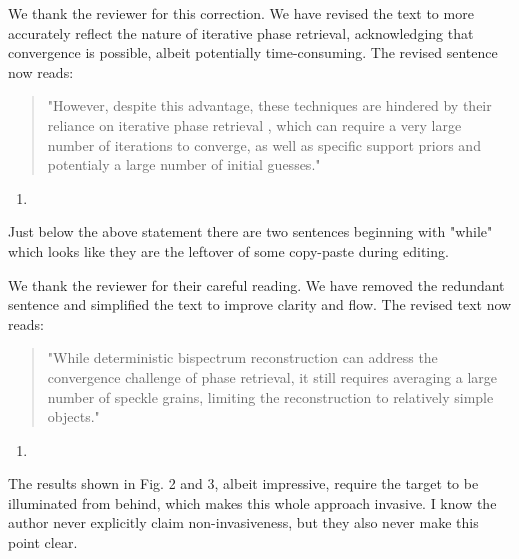 \documentclass[12pt]{article}
\newenvironment{solved_reviewercomment}
    {\begin{tcolorbox}[width=\linewidth,colback=gray!5,colframe=solved_commentcolor!50,title=Reviewer Comment,left=5pt,right=5pt]}
    {\end{tcolorbox}}
\newenvironment{finished_ourresponse}
    {\begin{tcolorbox}[width=\linewidth,breakable,enhanced,colback=gray!5,colframe=finished_responsecolor!50,title=Response,left=5pt,right=5pt]}
    {\end{tcolorbox}}
\begin{document}
\begin{finished_ourresponse}
    We thank the reviewer for this correction. We have revised the text to more accurately reflect the nature of iterative phase retrieval, acknowledging that convergence is possible, albeit potentially time-consuming. The revised sentence now reads:  
    \begin{quote}
        "However, despite this advantage, these techniques are hindered by their reliance on iterative phase retrieval \cite{fienup1978reconstruction}, which can require a very large number of iterations to converge, as well as specific support priors and potentialy a large number of initial guesses."
    \end{quote}
    
\end{finished_ourresponse}



\begin{enumerate}[label=\arabic*., resume]
\item \leavevmode
\end{enumerate}
\vspace{-1em}
\begin{solved_reviewercomment}
    Just below the above statement there are two sentences beginning with "while" which looks like they are the leftover of some copy-paste during editing.
\end{solved_reviewercomment}
\begin{finished_ourresponse}
    We thank the reviewer for their careful reading. We have removed the redundant sentence and simplified the text to improve clarity and flow. The revised text now reads:
    \begin{quote}
        "While deterministic bispectrum reconstruction can address the convergence challenge of phase retrieval, it still requires averaging a large number of speckle grains, limiting the reconstruction to relatively simple objects."
    \end{quote}
\end{finished_ourresponse}


        
\begin{enumerate}[label=\arabic*., resume]
\item \leavevmode
\end{enumerate}
\vspace{-1em}
\begin{solved_reviewercomment}
    The results shown in Fig. 2 and 3, albeit impressive, require the target to be illuminated from behind, which makes this whole approach invasive. I know the author never explicitly claim non-invasiveness, but they also never make this point clear.
\end{solved_reviewercomment}
\end{document}
